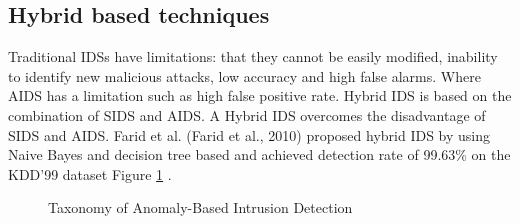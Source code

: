 \documentclass[12pt]{acmart}
\begin{document}
    \subsection{Hybrid based techniques}
        Traditional IDSs have limitations: that they cannot be easily modified, inability to identify new malicious attacks, low accuracy and high false alarms. Where AIDS has a limitation such as high false positive rate. Hybrid IDS is based on the combination of SIDS and AIDS. A Hybrid IDS overcomes the disadvantage of SIDS and AIDS. Farid et al. (Farid et al., 2010) proposed hybrid IDS by using Naive Bayes and decision tree based and achieved detection rate of 99.63\% on the KDD’99 dataset Figure \ref{fig1} .
        \begin{figure}[H]
            \caption{Taxonomy of Anomaly-Based Intrusion Detection}
            \label{fig1}
        \end{figure}
\end{document}
